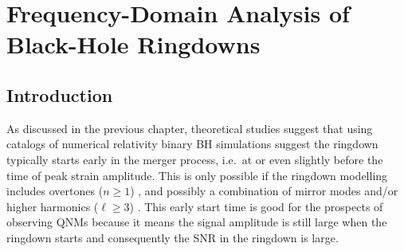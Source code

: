 
\chapter{Frequency-Domain Analysis of Black-Hole Ringdowns}

\label{Chapter3}

\section{Introduction}\label{ch3:sec:introduction}



As discussed in the previous chapter, theoretical studies suggest that using catalogs of numerical relativity binary BH simulations suggest the ringdown typically starts early in the merger process, i.e.\ at or even slightly before the time of peak strain amplitude. 
This is only possible if the ringdown modelling includes overtones ($n \geq 1$) \cite{Giesler:2019uxc, JimenezForteza:2020cve, Forteza:2021wfq}, and possibly a combination of mirror modes and/or higher harmonics ($\ell\geq 3$) \cite{Cook:2020otn, Dhani:2020nik, Finch:2021iip}.
This early start time is good for the prospects of observing QNMs because it means the signal amplitude is still large when the ringdown starts and consequently the SNR in the ringdown is large.

